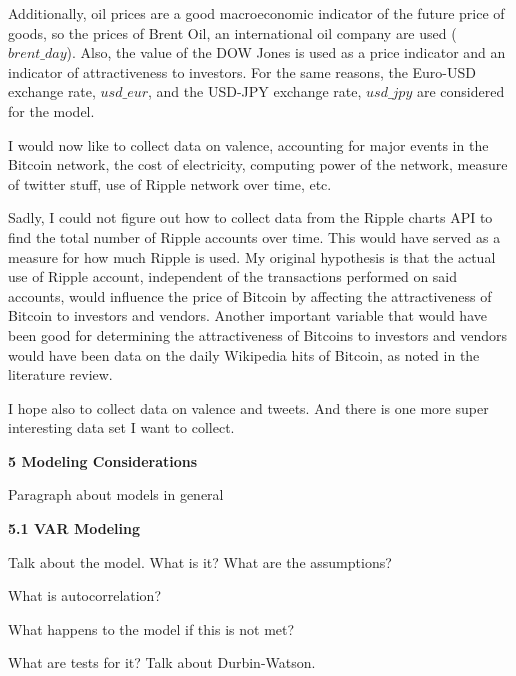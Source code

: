 \documentclass{article}[10 pt]
\newcommand{\vs}{\vspace{0.1in}}
\begin{document}
\vs

Additionally, oil prices are a good macroeconomic indicator of the future
price of goods, so the prices of Brent Oil, an international oil company are
used ($brent\_{day}$). Also, the value of the DOW Jones is used as a price
indicator and an indicator of attractiveness to investors. For the same
reasons, the Euro-USD exchange rate, $usd\_{eur}$, and the USD-JPY exchange
rate, $usd\_{jpy}$ are considered for the model.

\vs

I would now like to collect data on valence, accounting for major events in
the Bitcoin network, the cost of electricity, computing power of the
network, measure of twitter stuff, use of Ripple network over time, etc.

\vs


Sadly, I could not figure out how to collect data from the Ripple charts API
to find the total number of Ripple accounts over time. This would have
served as a measure for how much Ripple is used. My original hypothesis is
that the actual use of Ripple account, independent of the transactions
performed on said accounts, would influence the price of Bitcoin by
affecting the attractiveness of Bitcoin to investors and vendors. Another
important variable that would have been good for determining the
attractiveness of Bitcoins to investors and vendors would have been data on
the daily Wikipedia hits of Bitcoin, as noted in the literature review.

\vs

I hope also to collect data on valence and tweets. And there is one more
super interesting data set I want to collect.

\vs

\textbf{5 Modeling Considerations}

\vs

Paragraph about models in general

\textbf{5.1 VAR Modeling}

\vs

Talk about the model. What is it? What are the assumptions?

\vs

What is autocorrelation?

\vs

What happens to the model if this is not met?

\vs

What are tests for it? Talk about Durbin-Watson.

\vs
\end{document}

